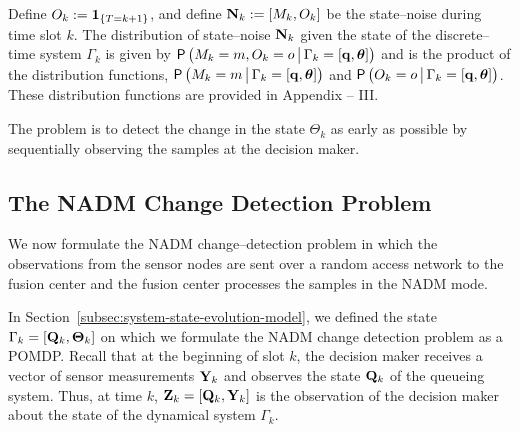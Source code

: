 \documentclass[acmtosn]{acmtrans2m}
\newcommand{\prob}[1]{\mathsf{P}\left(#1\right)}
\begin{document}
Define $O_k := {\bf 1}_{\{T = k+1\}}$, and define ${\bf N}_k := [M_k, O_k]$ 
be the state--noise during time slot $k$. 
The distribution of state--noise ${\bf N}_k$
given the state of the discrete--time system $\Gamma_k$ is given by $\prob{M_{k} = m, O_k = o
\big\arrowvert\Gamma_k = \left[{\bf q},{\mbox{\boldmath$\theta$}}\right]}$ and
is  the product of the distribution functions, 
$\prob{M_k = m   \big\arrowvert\Gamma_k = \left[{\bf
q},{\mbox{\boldmath$\theta$}}\right]}$ and 
$\prob{O_{k} = o \big\arrowvert\Gamma_k = \left[{\bf q},{\mbox{\boldmath$\theta$}}\right] 
}$. 
These distribution functions are provided in Appendix -- III. 

The problem is to detect the change in the state $\Theta_k$ as early as possible 
by sequentially observing the samples at the decision maker. 
\subsection{The NADM Change Detection Problem}
\label{subsec-the-NADM-change-detection-problem}
We now formulate the {\sf NADM} change--detection problem in which the observations 
from the sensor nodes are sent over a random access network to the fusion center 
and the fusion center processes the samples in the {\sf NADM} mode. 
 

In Section~\ref{subsec:system-state-evolution-model}, we defined the
state $\Gamma_k = [{\bf Q}_k, {\bf \Theta}_k]$ on which we formulate
the {\sf NADM} change detection problem as a POMDP.
Recall that at the beginning of slot $k$, the decision maker receives a vector of sensor 
measurements ${\bf Y}_k$ and observes the state ${\bf Q}_k$ of the queueing 
system. Thus, at time $k$, ${\bf Z}_{k} = [{\bf Q}_k,{\bf Y}_k]$ is the 
observation of the decision maker about the state of the dynamical system $\Gamma_k$.
\end{document}

